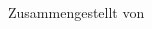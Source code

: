 \vspace*{1cm}
\begin{center}
   {\bdititle \bdiTitle}\\ \vspace{20pt}
   {\bdisubtitle Zusammengestellt von \collectedBy}\\
\end{center}
\vspace*{.5cm}
\begin{multicols}{2}
    \tableofcontents
\end{multicols}

\pagebreak